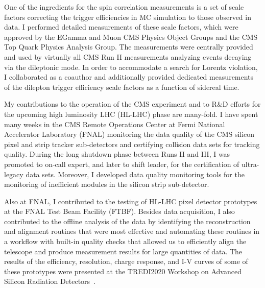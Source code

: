 One of the ingredients for the \ttbar spin correlation measurements is a set of scale factors correcting the trigger efficiencies in MC simulation to those observed in data.
I performed detailed measurements of these scale factors, which were approved by the EGamma and Muon CMS Physics Object Groups and the CMS Top Quark Physics Analysis Group.
The measurements were centrally provided and used by virtually all CMS Run II measurements analyzing \ttbar events decaying via the dileptonic mode.
In order to accommodate a search for Lorentz violation, I collaborated as a coauthor and additionally provided dedicated measurements of the dilepton trigger efficiency scale factors as a function of sidereal time.

My contributions to the operation of the CMS experiment and to R\&D efforts for the upcoming high luminosity LHC (HL-LHC) phase are many-fold.
I have spent many weeks in the CMS Remote Operations Center at Fermi National Accelerator Laboratory (FNAL) monitoring the data quality of the CMS silicon pixel and strip tracker sub-detectors and certifying collision data sets for tracking quality.
During the long shutdown phase between Runs II and III, I was promoted to on-call expert, and later to shift leader, for the certification of ultra-legacy data sets.
Moreover, I developed data quality monitoring tools for the monitoring of inefficient modules in the silicon strip sub-detector.

Also at FNAL, I contributed to the testing of HL-LHC pixel detector prototypes at the FNAL Test Beam Facility (FTBF).
Besides data acquisition, I also contributed to the offline analysis of the data by identifying the reconstruction and alignment routines that were most effective and automating these routines in a workflow with built-in quality checks that allowed us to efficiently align the telescope and produce measurement results for large quantities of data.
The results of the efficiency, resolution, charge response, and I-V curves of some of these prototypes were presented at the TREDI2020 Workshop on Advanced Silicon Radiation Detectors~\cite{TREDI2020}.

